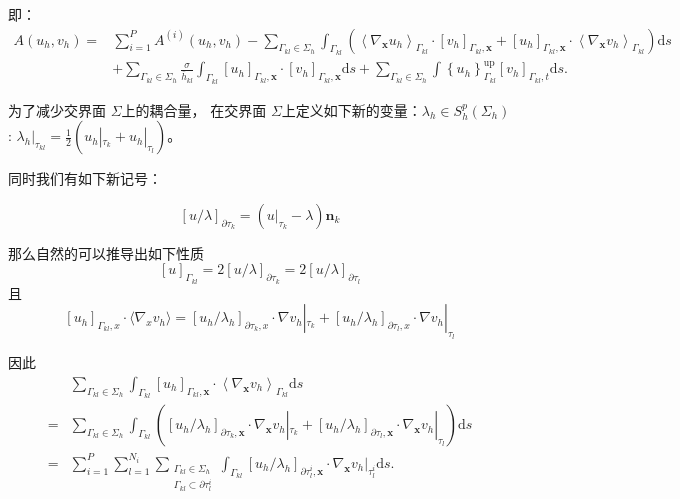即：
\begin{equation}\label{Hybrid}\begin{aligned}
    A\left(u_{h}, v_{h}\right)= & \sum_{i=1}^{P} A^{(i)}\left(u_{h}, v_{h}\right)
    -\sum_{\Gamma_{k l} \in \Sigma_{h}} \int_{\Gamma_{k l}}\left(\left\langle\nabla_{\boldsymbol{x}} u_{h}\right\rangle_{\Gamma_{k l}} \cdot\left[v_{h}\right]_{\Gamma_{k l}, \boldsymbol{x}} +\left[u_{h}\right]_{\Gamma_{k l}, \boldsymbol{x}} \cdot\left\langle\nabla_{\boldsymbol{x}} v_{h}\right\rangle_{\Gamma_{k l}}\right)\mathrm{d} s \\
    & +\sum_{\Gamma_{k l} \in \Sigma_{h}} \frac{\sigma}{\bar{h}_{k l}} \int_{\Gamma_{k l}}\left[u_{h}\right]_{\Gamma_{k l}, \boldsymbol{x}} \cdot\left[v_{h}\right]_{\Gamma_{k l}, \boldsymbol{x}} \mathrm{d} s +\sum_{\Gamma_{k l} \in \Sigma_{h}} \int\left\{u_{h}\right\}_{\Gamma_{k l}}^{\mathrm{up}}\left[v_{h}\right]_{\Gamma_{k l}, t} \mathrm{d} s .
\end{aligned}\end{equation}

为了减少交界面 $\Sigma$上的耦合量， 在交界面 $\Sigma$上定义如下新的变量：$\lambda_h\in S_h^p(\Sigma_h)$: $\lambda_h|_{\tau_{kl}}=\frac{1}{2}(u_h|_{\tau_k}+u_h|_{\tau_l})$。

同时我们有如下新记号：
\begin{definition}
    $$[u/\lambda]_{\partial \tau_k}=(u|_{\tau_k}-\lambda)\textbf{n}_k$$
\end{definition}

那么自然的可以推导出如下性质 $$[u]_{\Gamma_{kl}}=2[u/\lambda]_{\partial \tau_k}=2[u/\lambda]_{\partial \tau_l}$$ 
且 $$[u_h]_{\Gamma_{kl},x}\cdot \langle\nabla_x v_h\rangle=[u_h/\lambda_h]_{\partial \tau_k,x}\cdot\nabla v_h|_{\tau_k}+[u_h/\lambda_h]_{\partial \tau_l,x}\cdot\nabla v_h|_{\tau_l}$$

因此 
$$\begin{aligned}
    &\sum_{\Gamma_{k l} \in \Sigma_{h}} \int_{\Gamma_{k l}}\left[u_{h}\right]_{\Gamma_{k l}, \boldsymbol{x}} \cdot\left\langle\nabla_{\boldsymbol{x}} v_{h}\right\rangle_{\Gamma_{k l}} \mathrm{d} s\\
    =&\sum_{\Gamma_{k l} \in \Sigma_{h}}\int_{\Gamma_{k l}}\left(\left[u_{h} / \lambda_{h}\right]_{\partial \tau_{k}, \boldsymbol{x}} \cdot \nabla_{\boldsymbol{x}} v_{h }|_{\tau_{k}}+\left[u_{h} / \lambda_{h}\right]_{\partial \tau_{l}, \boldsymbol{x}} \cdot \nabla_{\boldsymbol{x}} v_{h }|_{\tau_{l}}\right) \mathrm{d} s \\
    =&\sum_{i=1}^{P} \sum_{l=1}^{N_{i}} \sum_{\substack{\Gamma_{k l} \in \Sigma_{h} \\\Gamma_{k l} \subset \partial \tau_{l}^{i} }}\int_{\Gamma_{k l}}\left[u_{h} / \lambda_{h}\right]_{\partial \tau_{l}^{i}, \boldsymbol{x}} \cdot \nabla_{\boldsymbol{x}} v_{h }|_{\tau_{l}^{i}} \mathrm{d} s .
\end{aligned}$$

